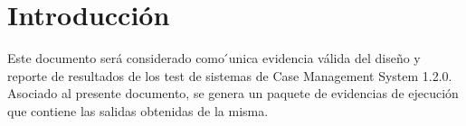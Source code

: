 \chapter{Introducción}
Este documento será considerado como ́unica evidencia válida del diseño y reporte de resultados de los test de sistemas de Case Management System 1.2.0. Asociado al presente documento, se genera un paquete de evidencias de ejecución que contiene las salidas obtenidas de la misma.